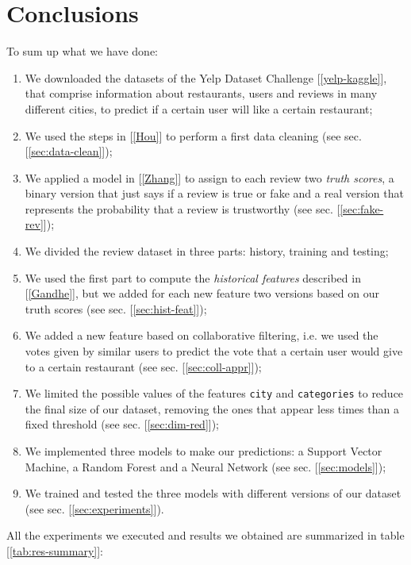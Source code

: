 
\section{Conclusions}

To sum up what we have done:
\begin{enumerate}
    \item We downloaded the datasets of the Yelp Dataset Challenge [\ref{yelp-kaggle}], that comprise information about restaurants, users and reviews in many different cities, to predict if a certain user will like a certain restaurant;
    \item We used the steps in [\ref{Hou}] to perform a first data cleaning (see sec. [\ref{sec:data-clean}]);
    \item We applied a model in [\ref{Zhang}] to assign to each review two \textit{truth scores}, a binary version that just says if a review is true or fake and a real version that represents the probability that a review is trustworthy (see sec. [\ref{sec:fake-rev}]);
    \item We divided the review dataset in three parts: history, training and testing;
    \item We used the first part to compute the \textit{historical features} described in [\ref{Gandhe}], but we added for each new feature two versions based on our truth scores (see sec. [\ref{sec:hist-feat}]);
    \item We added a new feature based on collaborative filtering, i.e. we used the votes given by similar users to predict the vote that a certain user would give to a certain restaurant (see sec. [\ref{sec:coll-appr}]);
    \item We limited the possible values of the features \texttt{city} and \texttt{categories} to reduce the final size of our dataset, removing the ones that appear less times than a fixed threshold (see sec. [\ref{sec:dim-red}]);
    \item We implemented three models to make our predictions: a Support Vector Machine, a Random Forest and a Neural Network (see sec. [\ref{sec:models}]);
    \item We trained and tested the three models with different versions of our dataset (see sec. [\ref{sec:experiments}]).
\end{enumerate}

All the experiments we executed and results we obtained are summarized in table [\ref{tab:res-summary}]:

